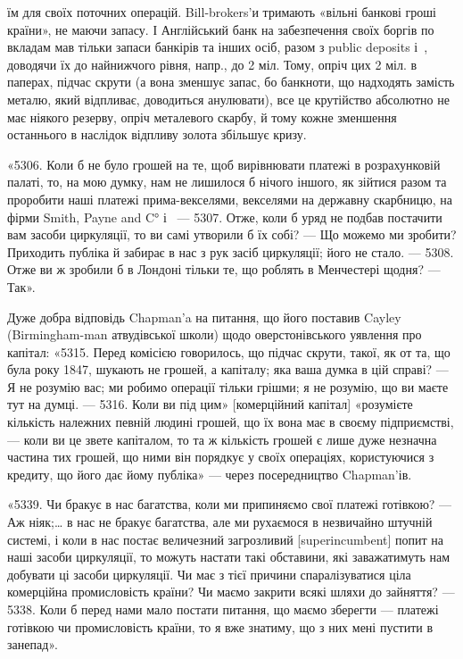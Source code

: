 \parcont{}  %
їм для своїх поточних операцій. Bill-brokers’и тримають «вільні банкові гроші
країни», не маючи запасу. І Англійський банк на забезпечення своїх боргів по
вкладам мав тільки запаси банкірів та інших осіб, разом з public deposits і~,
доводячи їх до найнижчого рівня, напр., до 2 міл. Тому, опріч цих 2 міл. в паперах,
підчас скрути (а вона зменшує запас, бо банкноти, що надходять замість
металю, який відпливає, доводиться анулювати), все це крутійство абсолютно
не має ніякого резерву, опріч металевого скарбу, й тому кожне зменшення останнього
в наслідок відпливу золота збільшує кризу.

«5306. Коли б не було грошей на те, щоб вирівнювати платежі в розрахунковій
палаті, то, на мою думку, нам не лишилося б нічого іншого, як
зійтися разом та проробити наші платежі прима-векселями, векселями на державну
скарбницю, на фірми Smith, Payne and C° і~ — 5307. Отже, коли б
уряд не подбав постачити вам засоби циркуляції, то ви самі утворили б їх
собі? — Що можемо ми зробити? Приходить публіка й забирає в нас з рук
засіб циркуляції; його не стало. — 5308. Отже ви ж зробили б в Лондоні тільки
те, що роблять в Менчестері щодня? — Так».

Дуже добра відповідь Chapman’a на питання, що його поставив Cayley
(Birmingham-man атвудівської школи) щодо оверстонівського уявлення про
капітал: «5315. Перед комісією говорилось, що підчас скрути, такої, як от та,
що була року 1847, шукають не грошей, а капіталу; яка ваша думка в цій
справі? — Я не розумію вас; ми робимо операції тільки грішми; я не розумію,
що ви маєте тут на думці. — 5316. Коли ви під цим» [комерційний капітал]
«розумієте кількість належних певній людині грошей, що їх вона має в
своєму підприємстві, — коли ви це звете капіталом, то та ж кількість грошей є
лише дуже незначна частина тих грошей, що ними він порядкує у своїх операціях,
користуючися з кредиту, що його дає йому публіка» — через посередництво
Chapman’ів.

«5339. Чи бракує в нас багатства, коли ми припиняємо свої платежі готівкою?
— Аж ніяк;\dots{} в нас не бракує багатства, але ми рухаємося в незвичайно
штучній системі, і коли в нас постає величезний загрозливий [superincumbent]
попит на наші засоби циркуляції, то можуть настати такі обставини, які
заважатимуть нам добувати ці засоби циркуляції. Чи має з тієї причини спаралізуватися
ціла комерційна промисловість країни? Чи маємо закрити всякі
шляхи до зайняття? — 5338. Коли б перед нами мало постати питання, що
маємо зберегти — платежі готівкою чи промисловість країни, то я вже знатиму,
що з них мені пустити в занепад».

